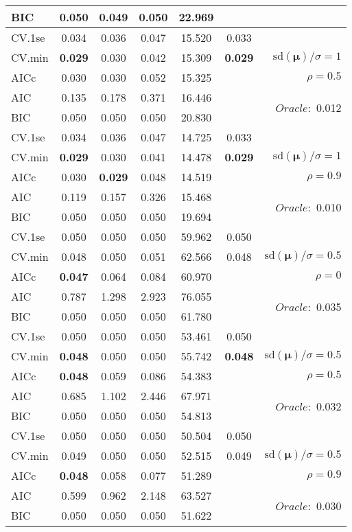 \begin{table}
\begin{center}
\begin{tabular}{l*{5}{c}|r}
BIC & 0.050 & 0.049 & 0.050 & 22.969 & &  \\
 \hline 
CV.1se & 0.034 & 0.036 & 0.047 & 15.520 & 0.033 & \\
CV.min & {\bf 0.029} & 0.030 & 0.042 & 15.309 & {\bf 0.029} &  $\mathrm{sd}(\mathbf{\mu})/\sigma=1$ \\
AICc & 0.030 & 0.030 & 0.052 & 15.325 & & $\rho=0.5$ \\
AIC & 0.135 & 0.178 & 0.371 & 16.446 & &  \multirow{2}{*}{$Oracle: $ 0.012} \\
BIC & 0.050 & 0.050 & 0.050 & 20.830 & &  \\
 \hline 
CV.1se & 0.034 & 0.036 & 0.047 & 14.725 & 0.033 & \\
CV.min & {\bf 0.029} & 0.030 & 0.041 & 14.478 & {\bf 0.029} &  $\mathrm{sd}(\mathbf{\mu})/\sigma=1$ \\
AICc & 0.030 & {\bf 0.029} & 0.048 & 14.519 & & $\rho=0.9$ \\
AIC & 0.119 & 0.157 & 0.326 & 15.468 & &  \multirow{2}{*}{$Oracle: $ 0.010} \\
BIC & 0.050 & 0.050 & 0.050 & 19.694 & &  \\
 \hline 
CV.1se & 0.050 & 0.050 & 0.050 & 59.962 & 0.050 & \\
CV.min & 0.048 & 0.050 & 0.051 & 62.566 & 0.048 &  $\mathrm{sd}(\mathbf{\mu})/\sigma=0.5$ \\
AICc & {\bf 0.047} & 0.064 & 0.084 & 60.970 & & $\rho=0$ \\
AIC & 0.787 & 1.298 & 2.923 & 76.055 & &  \multirow{2}{*}{$Oracle: $ 0.035} \\
BIC & 0.050 & 0.050 & 0.050 & 61.780 & &  \\
 \hline 
CV.1se & 0.050 & 0.050 & 0.050 & 53.461 & 0.050 & \\
CV.min & {\bf 0.048} & 0.050 & 0.050 & 55.742 & {\bf 0.048} &  $\mathrm{sd}(\mathbf{\mu})/\sigma=0.5$ \\
AICc & {\bf 0.048} & 0.059 & 0.086 & 54.383 & & $\rho=0.5$ \\
AIC & 0.685 & 1.102 & 2.446 & 67.971 & &  \multirow{2}{*}{$Oracle: $ 0.032} \\
BIC & 0.050 & 0.050 & 0.050 & 54.813 & &  \\
 \hline 
CV.1se & 0.050 & 0.050 & 0.050 & 50.504 & 0.050 & \\
CV.min & 0.049 & 0.050 & 0.050 & 52.515 & 0.049 &  $\mathrm{sd}(\mathbf{\mu})/\sigma=0.5$ \\
AICc & {\bf 0.048} & 0.058 & 0.077 & 51.289 & & $\rho=0.9$ \\
AIC & 0.599 & 0.962 & 2.148 & 63.527 & &  \multirow{2}{*}{$Oracle: $ 0.030} \\
BIC & 0.050 & 0.050 & 0.050 & 51.622 & &  \\
 \hline 
\end{tabular}
\end{center}
\vspace{-1cm}
\end{table}




